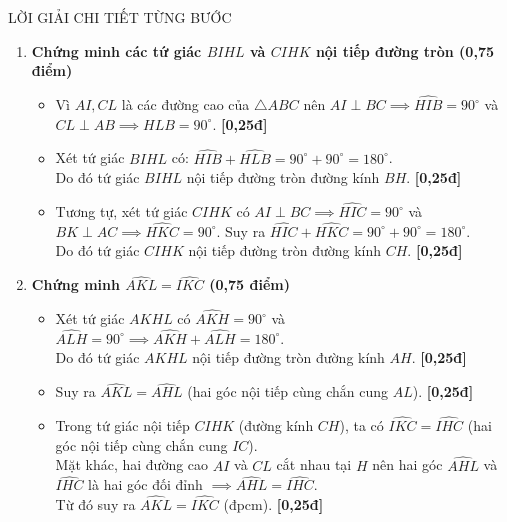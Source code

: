 \documentclass[11pt,a4paper]{article}
\begin{document}
\begin{solutionbox}{LỜI GIẢI CHI TIẾT TỪNG BƯỚC}
\begin{enumerate}[label=\textbf{\arabic*.}, leftmargin=*]
    \item \textbf{Chứng minh các tứ giác $BIHL$ và $CIHK$ nội tiếp đường tròn (0,75 điểm)}
    \begin{itemize}[leftmargin=*, nosep]
        \item Vì $AI, CL$ là các đường cao của $\triangle ABC$ nên $AI \perp BC \implies \widehat{HIB} = 90^\circ$ và $CL \perp AB \implies \widehat{HLB} = 90^\circ$. \hfill \textbf{[0,25đ]}
        \item Xét tứ giác $BIHL$ có: $\widehat{HIB} + \widehat{HLB} = 90^\circ + 90^\circ = 180^\circ$.\\
        Do đó tứ giác $BIHL$ nội tiếp đường tròn đường kính $BH$. \hfill \textbf{[0,25đ]}
        \item Tương tự, xét tứ giác $CIHK$ có $AI \perp BC \implies \widehat{HIC} = 90^\circ$ và $BK \perp AC \implies \widehat{HKC} = 90^\circ$.
        Suy ra $\widehat{HIC} + \widehat{HKC} = 90^\circ + 90^\circ = 180^\circ$.\\
        Do đó tứ giác $CIHK$ nội tiếp đường tròn đường kính $CH$. \hfill \textbf{[0,25đ]}
    \end{itemize}

    \vspace{1mm}
    \item \textbf{Chứng minh $\widehat{AKL} = \widehat{IKC}$ (0,75 điểm)}
    \begin{itemize}[leftmargin=*, nosep]
        \item Xét tứ giác $AKHL$ có $\widehat{AKH} = 90^\circ$ và $\widehat{ALH} = 90^\circ \implies \widehat{AKH} + \widehat{ALH} = 180^\circ$.\\
        Do đó tứ giác $AKHL$ nội tiếp đường tròn đường kính $AH$. \hfill \textbf{[0,25đ]}
        \item Suy ra $\widehat{AKL} = \widehat{AHL}$ (hai góc nội tiếp cùng chắn cung $AL$). \hfill \textbf{[0,25đ]}
        \item Trong tứ giác nội tiếp $CIHK$ (đường kính $CH$), ta có $\widehat{IKC} = \widehat{IHC}$ (hai góc nội tiếp cùng chắn cung $IC$).\\
        Mặt khác, hai đường cao $AI$ và $CL$ cắt nhau tại $H$ nên hai góc $\widehat{AHL}$ và $\widehat{IHC}$ là hai góc đối đỉnh $\implies \widehat{AHL} = \widehat{IHC}$.\\
        Từ đó suy ra $\widehat{AKL} = \widehat{IKC}$ (đpcm). \hfill \textbf{[0,25đ]}
    \end{itemize}


\end{enumerate}
\end{solutionbox}
\end{document}
